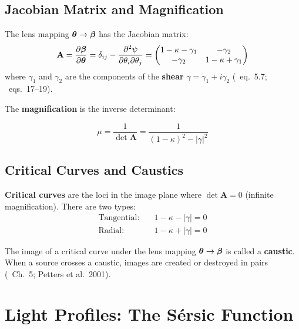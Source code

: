 \documentclass[11pt, letterpaper]{article}
\begin{document}
\subsection{Jacobian Matrix and Magnification}

The lens mapping $\bm{\theta} \to \bm{\beta}$ has the Jacobian matrix:
\begin{equation}
\mathbf{A} = \frac{\partial \bm{\beta}}{\partial \bm{\theta}}
= \delta_{ij} - \frac{\partial^2 \psi}{\partial \theta_i \partial \theta_j}
= \begin{pmatrix}
1 - \kappa - \gamma_1 & -\gamma_2 \\
-\gamma_2 & 1 - \kappa + \gamma_1
\end{pmatrix}
\label{eq:jacobian}
\end{equation}
where $\gamma_1$ and $\gamma_2$ are the components of the \textbf{shear}
$\gamma = \gamma_1 + i\gamma_2$ (\CK\ eq.~5.7; \NB\ eqs.~17--19).

The \textbf{magnification} is the inverse determinant:
\begin{keyresult}
\begin{equation}
\mu = \frac{1}{\det \mathbf{A}} = \frac{1}{(1-\kappa)^2 - |\gamma|^2}
\label{eq:magnification}
\end{equation}
\end{keyresult}

\subsection{Critical Curves and Caustics}

\textbf{Critical curves} are the loci in the image plane where
$\det \mathbf{A} = 0$ (infinite magnification). There are two types:
\begin{align}
\text{Tangential:}\quad & 1 - \kappa - |\gamma| = 0 \label{eq:tangential-cc} \\
\text{Radial:}\quad     & 1 - \kappa + |\gamma| = 0 \label{eq:radial-cc}
\end{align}

The image of a critical curve under the lens mapping $\bm{\theta} \to \bm{\beta}$
is called a \textbf{caustic}. When a source crosses a caustic, images are
created or destroyed in pairs (\CK\ Ch.~5; Petters et al.\ 2001).

\section{Light Profiles: The S\'ersic Function}
\label{sec:sersic}
\end{document}
